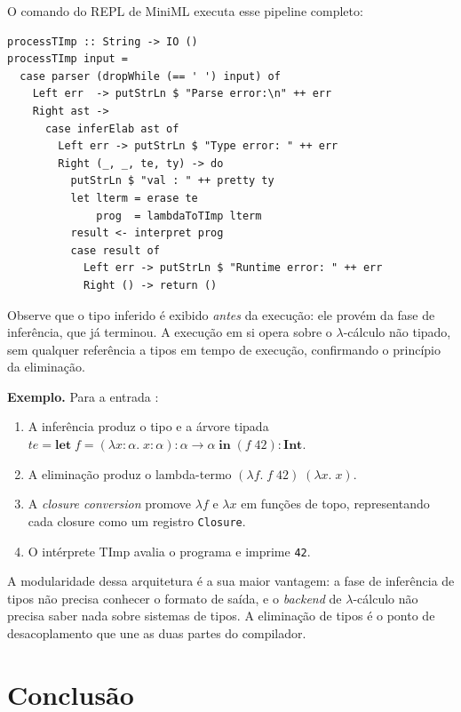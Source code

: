   O comando  do REPL de MiniML executa esse pipeline
  completo:

\begin{verbatim}
processTImp :: String -> IO ()
processTImp input =
  case parser (dropWhile (== ' ') input) of
    Left err  -> putStrLn $ "Parse error:\n" ++ err
    Right ast ->
      case inferElab ast of
        Left err -> putStrLn $ "Type error: " ++ err
        Right (_, _, te, ty) -> do
          putStrLn $ "val : " ++ pretty ty
          let lterm = erase te
              prog  = lambdaToTImp lterm
          result <- interpret prog
          case result of
            Left err -> putStrLn $ "Runtime error: " ++ err
            Right () -> return ()
\end{verbatim}

  Observe que o tipo inferido é exibido \emph{antes} da execução: ele
  provém da fase de inferência, que já terminou. A execução em si opera
  sobre o $\lambda$-cálculo não tipado, sem qualquer referência a tipos em
  tempo de execução, confirmando o princípio da eliminação.

  \textbf{Exemplo.} Para a entrada :

  \begin{enumerate}
    \item A inferência produz o tipo  e a árvore tipada
      \(te = \mathbf{let}\; f = (\lambda x{:}\alpha.\; x{:}\alpha){:}\alpha
      \to \alpha\; \mathbf{in}\; (f\; 42){:}\mathbf{Int}\).
    \item A eliminação produz o lambda-termo
      \((\lambda f.\; f\; 42)\; (\lambda x.\; x)\).
    \item A \emph{closure conversion} promove \(\lambda f\) e \(\lambda
      x\) em funções de topo, representando cada closure como um registro
      \texttt{Closure}.
    \item O intérprete TImp avalia o programa e imprime \texttt{42}.
  \end{enumerate}

  A modularidade dessa arquitetura é a sua maior vantagem: a fase de
  inferência de tipos não precisa conhecer o formato de saída, e o
  \emph{backend} de $\lambda$-cálculo não precisa saber nada sobre sistemas
  de tipos. A eliminação de tipos é o ponto de desacoplamento que une as
  duas partes do compilador.

  \section{Conclusão}

